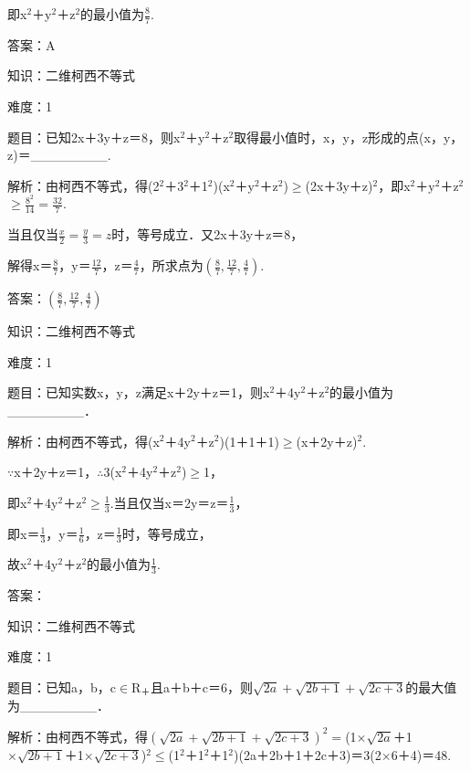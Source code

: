 \documentclass{article} %
\begin{document}
即x${}^{2}$＋y${}^{2}$＋z${}^{2}$的最小值为$\frac{8}{7}$.

 答案：A



 知识：二维柯西不等式

 难度：1

 题目：已知2x＋3y＋z＝8，则x${}^{2}$＋y${}^{2}$＋z${}^{2}$取得最小值时，x，y，z形成的点(x，y，z)＝\_\_\_\_\_\_\_\_.

 解析：由柯西不等式，得(2${}^{2}$＋3${}^{2}$＋1${}^{2}$)(x${}^{2}$＋y${}^{2}$＋z${}^{2}$)$\mathrm{\ge}$(2x＋3y＋z)${}^{2}$，即x${}^{2}$＋y${}^{2}$＋z${}^{2}$$\mathrm{\ge}\frac{8^2}{14}=\frac{32}{7}$.

当且仅当$\frac{x}{2}=\frac{y}{3}=z$时，等号成立．又2x＋3y＋z＝8，

解得x＝$\frac{8}{7}$，y＝$\frac{12}{7}$，z＝$\frac{4}{7}$，所求点为$(\frac{8}{7}, \frac{12}{7}, \frac{4}{7})$.

 答案：$(\frac{8}{7}, \frac{12}{7}, \frac{4}{7})$

 

 知识：二维柯西不等式

 难度：1

 题目：已知实数x，y，z满足x＋2y＋z＝1，则x${}^{2}$＋4y${}^{2}$＋z${}^{2}$的最小值为\_\_\_\_\_\_\_\_．

解析：由柯西不等式，得(x${}^{2}$＋4y${}^{2}$＋z${}^{2}$)(1＋1＋1)$\mathrm{\ge}$(x＋2y＋z)${}^{2}$.

$\mathrm{\because}$x＋2y＋z＝1，$\mathrm{\therefore}$3(x${}^{2}$＋4y${}^{2}$＋z${}^{2}$)$\mathrm{\ge}$1，

即x${}^{2}$＋4y${}^{2}$＋z${}^{2}$$\mathrm{\ge}\frac{1}{3}$.当且仅当x＝2y＝z＝$\frac{1}{3}$，

即x＝$\frac{1}{3}$，y＝$\frac{1}{6}$，z＝$\frac{1}{3}$时，等号成立，

故x${}^{2}$＋4y${}^{2}$＋z${}^{2}$的最小值为$\frac{1}{3}$.

 答案：

 

 知识：二维柯西不等式

 难度：1

 题目：已知a，b，c$\mathrm{\in}$R${}_{\textrm{＋}}$且a＋b＋c＝6，则$\sqrt{2a}+\sqrt{2b+1}+\sqrt{2c+3}$的最大值为\_\_\_\_\_\_\_\_．

 解析：由柯西不等式，得$(\sqrt{2a}+\sqrt{2b+1}+\sqrt{2c+3})^2=$(1$\mathrm{\times}\sqrt{2a}$＋1$\mathrm{\times}\sqrt{2b+1}$＋1$\mathrm{\times}\sqrt{2c+3}$)${}^{2}$$\mathrm{\le}$(1${}^{2}$＋1${}^{2}$＋1${}^{2}$)(2a＋2b＋1＋2c＋3)＝3(2$\mathrm{\times}$6＋4)＝48.
\end{document}
